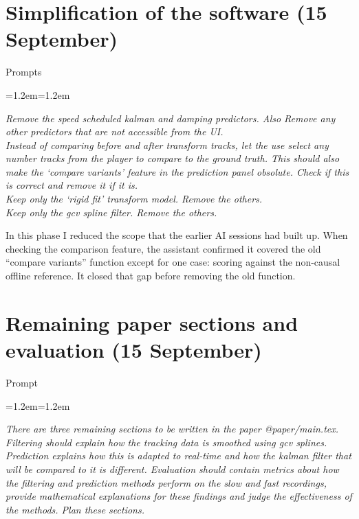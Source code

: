 \documentclass[11pt,a4paper]{article}
\newenvironment{prompt}[1]
  {\par\smallskip\noindent\textsf{\small #1}\par\nopagebreak
   \begin{list}{}{\leftmargin=1.2em\rightmargin=1.2em}\item\itshape\small}
  {\end{list}\smallskip}
\begin{document}
\section{Simplification of the software (15 September)}

\begin{prompt}{Prompts}
Remove the speed scheduled kalman and damping predictors. Also Remove any other predictors that are not accessible from the UI.\\[2pt]
Instead of comparing before and after transform tracks, let the use select any number tracks from the player to compare to the ground truth. This should also make the `compare variants' feature in the prediction panel obsolute. Check if this is correct and remove it if it is.\\[2pt]
Keep only the `rigid fit' transform model. Remove the others.\\[2pt]
Keep only the gcv spline filter. Remove the others.
\end{prompt}

In this phase I reduced the scope that the earlier AI sessions had built up.
When checking the comparison feature, the assistant confirmed it covered the old ``compare variants'' function except for one case: scoring against the non-causal offline reference.
It closed that gap before removing the old function.

\section{Remaining paper sections and evaluation (15 September)}

\begin{prompt}{Prompt}
There are three remaining sections to be written in the paper @paper/main.tex. Filtering should explain how the tracking data is smoothed using gcv splines. Prediction explains how this is adapted to real-time and how the kalman filter that will be compared to it is different. Evaluation should contain metrics about how the filtering and prediction methods perform on the slow and fast recordings, provide mathematical explanations for these findings and judge the effectiveness of the methods. Plan these sections.
\end{prompt}
\end{document}
